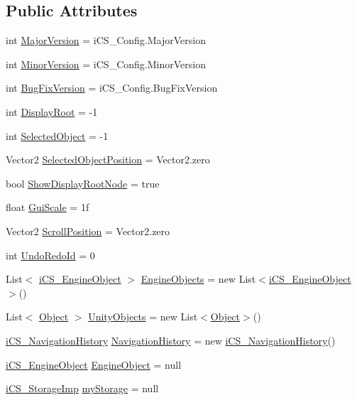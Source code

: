 \subsection*{Public Attributes}
\begin{DoxyCompactItemize}
\item 
int \hyperlink{classi_c_s___mono_behaviour_imp_a4997378a3c0cf43e35b19b24e47fc750}{Major\+Version} = i\+C\+S\+\_\+\+Config.\+Major\+Version
\item 
int \hyperlink{classi_c_s___mono_behaviour_imp_a6723ae76fc7610b4352bd51bd7add5a2}{Minor\+Version} = i\+C\+S\+\_\+\+Config.\+Minor\+Version
\item 
int \hyperlink{classi_c_s___mono_behaviour_imp_a6c6fdc9809885cea438d296d08a2fd29}{Bug\+Fix\+Version} = i\+C\+S\+\_\+\+Config.\+Bug\+Fix\+Version
\item 
int \hyperlink{classi_c_s___mono_behaviour_imp_a6375b450d9f3ac301de2d6cb87bf8c07}{Display\+Root} = -\/1
\item 
int \hyperlink{classi_c_s___mono_behaviour_imp_ad19610ebcf41db700efa9890eabe5476}{Selected\+Object} = -\/1
\item 
Vector2 \hyperlink{classi_c_s___mono_behaviour_imp_a2940746cae06b56cedd5e75873c5f6f5}{Selected\+Object\+Position} = Vector2.\+zero
\item 
bool \hyperlink{classi_c_s___mono_behaviour_imp_abf3661d1041b4342561d1198fc360bf4}{Show\+Display\+Root\+Node} = true
\item 
float \hyperlink{classi_c_s___mono_behaviour_imp_a0962fd37bc8b6e6105b3caacfe72f900}{Gui\+Scale} = 1f
\item 
Vector2 \hyperlink{classi_c_s___mono_behaviour_imp_a48611eb6a8094ca30921ac13cadc7df0}{Scroll\+Position} = Vector2.\+zero
\item 
int \hyperlink{classi_c_s___mono_behaviour_imp_abd0c66db60261c37d9885aafbde5b6b2}{Undo\+Redo\+Id} = 0
\item 
List$<$ \hyperlink{classi_c_s___engine_object}{i\+C\+S\+\_\+\+Engine\+Object} $>$ \hyperlink{classi_c_s___mono_behaviour_imp_a486243fbec43c4c7079b3641dfcb5112}{Engine\+Objects} = new List$<$\hyperlink{classi_c_s___engine_object}{i\+C\+S\+\_\+\+Engine\+Object}$>$()
\item 
List$<$ \hyperlink{i_c_s___logic_8cs_a5b2c8b05b9a357906d7f9e5b2c1e154d}{Object} $>$ \hyperlink{classi_c_s___mono_behaviour_imp_a4b094bafa016da5f142c93b588db58a9}{Unity\+Objects} = new List$<$\hyperlink{i_c_s___logic_8cs_a5b2c8b05b9a357906d7f9e5b2c1e154d}{Object}$>$()
\item 
\hyperlink{classi_c_s___navigation_history}{i\+C\+S\+\_\+\+Navigation\+History} \hyperlink{classi_c_s___mono_behaviour_imp_aeea8e6220ce6edee7f258f16a9d9a7cb}{Navigation\+History} = new \hyperlink{classi_c_s___navigation_history}{i\+C\+S\+\_\+\+Navigation\+History}()
\item 
\hyperlink{classi_c_s___engine_object}{i\+C\+S\+\_\+\+Engine\+Object} \hyperlink{classi_c_s___mono_behaviour_imp_a26bb3c80051ff450e4fa45072ce836fc}{Engine\+Object} = null
\item 
\hyperlink{classi_c_s___storage_imp}{i\+C\+S\+\_\+\+Storage\+Imp} \hyperlink{classi_c_s___mono_behaviour_imp_a7d99bfd829daddc321daeb6ad4080f12}{my\+Storage} = null
\end{DoxyCompactItemize}
